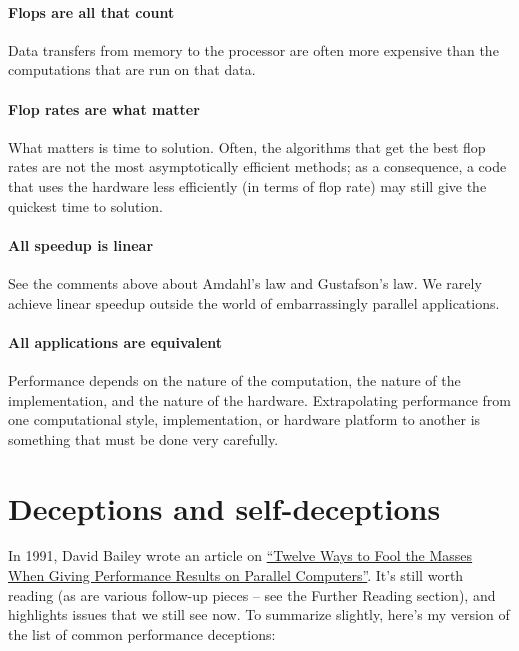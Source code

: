 \documentclass[12pt, leqno]{article} %
\begin{document}
\paragraph{Flops are all that count}

Data transfers from memory to the processor are often more expensive
than the computations that are run on that data.

\paragraph{Flop rates are what matter}

What matters is time to solution. Often, the algorithms that get the
best flop rates are not the most asymptotically efficient methods; as a
consequence, a code that uses the hardware less efficiently (in terms of
flop rate) may still give the quickest time to solution.

\paragraph{All speedup is linear}

See the comments above about Amdahl's law and Gustafson's law. We rarely
achieve linear speedup outside the world of embarrassingly parallel
applications.

\paragraph{All applications are equivalent}

Performance depends on the nature of the computation, the nature of the
implementation, and the nature of the hardware. Extrapolating
performance from one computational style, implementation, or hardware
platform to another is something that must be done very carefully.

\section{Deceptions and self-deceptions}

In 1991, David Bailey wrote an article on
\href{http://www.davidhbailey.com/dhbpapers/twelve-ways.pdf}{``Twelve
Ways to Fool the Masses When Giving Performance Results on Parallel
Computers''}. It's still worth reading (as are various follow-up pieces
-- see the Further Reading section), and highlights issues that we still
see now. To summarize slightly, here's my version of the list of common
performance deceptions:
\end{document}
